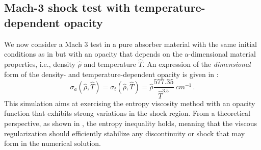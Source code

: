 \documentclass[times,doublespace]{fldauth}%
\begin{document}
\subsection{Mach-3 shock test with temperature-dependent opacity}\label{sec:mach-3-no-cst-xs}
%
We now consider a Mach 3 test in a pure absorber material with the same initial conditions as in  but with an opacity that depends on the a-dimensional material properties, i.e., density $\hat{\rho}$ and temperature $\hat{T}$. An expression of the \emph{dimensional} form of the density- and  temperature-dependent opacity is given in :
%
\begin{equation}\label{eq:opacity}
\sigma_a(\hat{\rho},\hat{T}) = \sigma_t(\hat{\rho},\hat{T}) = \hat{\rho} \frac{577.35}{\hat{T}^{3.5}} \ cm^{-1}\, .
\end{equation}
%
This simulation aims at exercising the entropy viscosity method with an opacity function that exhibits strong variations in the shock region. From a theoretical perspective, as shown in , the entropy inequality holds, meaning that the viscous regularization should efficiently stabilize any discontinuity or shock that may form in the numerical solution. 
\end{document}

